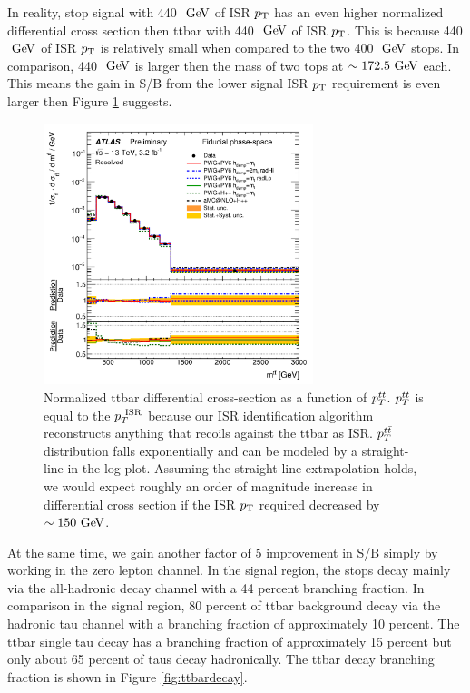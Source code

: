\indent In reality, stop signal with 440 $\gev$ of ISR $p_{\mathrm{T}}$ has an even higher normalized differential cross section then ttbar with 440 $\gev$ of ISR $p_{\mathrm{T}}$.  This is because 440 $\gev$ of ISR $p_{\mathrm{T}}$ is relatively small when compared to the two 400 $\gev$ stops.  In comparison, 440 $\gev$ is larger then the mass of two tops at $\sim172.5 \gev$ each.  This means the gain in S/B from the lower signal ISR $p_{\mathrm{T}}$ requirement is even larger then Figure \ref{fig:ttbar:ttpt} suggests.  \\

\begin{figure}[h!]
  \centering
	\includegraphics[width=0.70\textwidth]{./figures/strategy/ttbar_mtt.png}
	\caption[Normalized ttbar differential cross section as a function of $p_T^{t\tbar}$]{Normalized ttbar differential cross-section as a function of $p_T^{t\tbar}$.\cite{ttbarDiffCross}  $p_T^{t\tbar}$ is equal to the $p_{T}^{~\mathrm{ISR}}$ because our ISR identification algorithm reconstructs anything that recoils against the ttbar as ISR.  $p_T^{t\tbar}$ distribution falls exponentially and can be modeled by a straight-line in the log plot.  Assuming the straight-line extrapolation holds, we would expect roughly an order of magnitude increase in differential cross section if the ISR $p_{\mathrm{T}}$ required decreased by $\sim150 \gev$.  }
\label{fig:ttbar:ttpt}
\end{figure}

\indent At the same time, we gain another factor of 5 improvement in S/B simply by working in the zero lepton channel.  In the signal region, the stops decay mainly via the all-hadronic decay channel with a 44 percent branching fraction.  In comparison in the signal region, 80 percent of ttbar background decay via the hadronic tau channel with a branching fraction of approximately 10 percent.  The ttbar single tau decay has a branching fraction of approximately 15 percent but only about 65 percent of taus decay hadronically. The ttbar decay branching fraction is shown in Figure \ref{fig:ttbardecay}.\\


